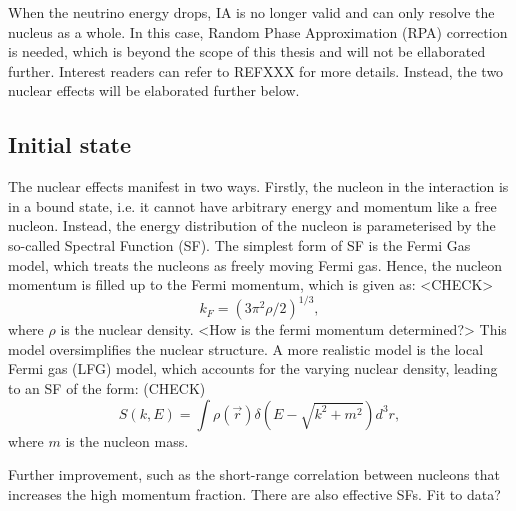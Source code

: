 When the neutrino energy drops, IA is no longer valid and can only resolve the nucleus as a whole.
In this case, Random Phase Approximation (RPA) correction is needed, which is beyond the scope of this thesis and will not be ellaborated further. 
Interest readers can refer to REFXXX for more details.
Instead, the two nuclear effects will be elaborated further below.

  \subsection{Initial state}
  The nuclear effects manifest in two ways.
  Firstly, the nucleon in the interaction is in a bound state, i.e. it cannot have arbitrary energy and momentum like a free nucleon.
  Instead, the energy distribution of the nucleon is parameterised by the so-called Spectral Function (SF).
  The simplest form of SF is the Fermi Gas model, which treats the nucleons as freely moving Fermi gas.
  Hence, the nucleon momentum is filled up to the Fermi momentum, which is given as:
  <CHECK>
  \begin{equation}
      k_F = (3\pi^2 \rho/2)^{1/3},
  \end{equation}
  where $\rho$ is the nuclear density.
  <How is the fermi momentum determined?>
  This model oversimplifies the nuclear structure.
  A more realistic model is the local Fermi gas (LFG) model, which accounts for the varying nuclear density, leading to an SF of the form:
  (CHECK)
  \begin{equation}
      S(k, E) = \int \rho(\vec{r}) \delta(E - \sqrt{k^2 + m^2}) d^3r,
  \end{equation}
  where $m$ is the nucleon mass.

  Further improvement, such as the short-range correlation between nucleons that increases the high momentum fraction.
  There are also effective SFs. Fit to data?

